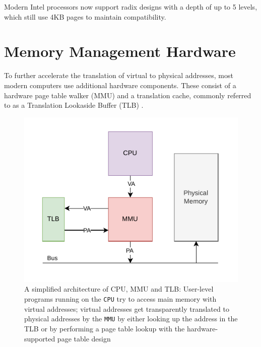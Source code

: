 Modern Intel processors now support radix designs with a depth of up to 5 levels,
which still use 4KB pages to maintain compatibility.





\cite{denning1970virtual} %
\section{Memory Management Hardware}
To further accelerate the translation of virtual to physical addresses, most modern computers use additional
hardware components. These consist of a hardware page table walker (MMU) and a translation cache,
commonly referred to as a Translation Lookaside Buffer (TLB) \cite{jacobVirtualMemoryContemporary1998}.

\begin{figure}[t]
    \centering
    \includegraphics[scale=1.2]{figures/simple_mmu_arch.pdf}
    \caption[A simplified architecture of CPU, MMU and TLB]{A simplified architecture of CPU, MMU and TLB:
        User-level programs running on the \texttt{CPU} try to access main memory with virtual
        addresses; virtual addresses get transparently translated to physical addresses by the
        \texttt{MMU} by either looking up the address in the TLB or by performing a page table
        lookup with the hardware-supported page table design}
    \label{fig:fund:simplearch}
\end{figure}

